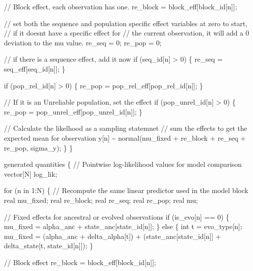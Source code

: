 \documentclass[
]{article}
\newenvironment{Shaded}{\begin{snugshade}}{\end{snugshade}}
\newcommand{\StringTok}[1]{\textcolor[rgb]{0.31,0.60,0.02}{#1}}
\begin{document}
\begin{Shaded}
\begin{Highlighting}[]
\StringTok{    // Block effect, each observation has one.}
\StringTok{    re\_block = block\_eff[block\_id[n]];}

\StringTok{    // set both the sequence and population specific effect variables at zero to start, }
\StringTok{    // if it doesn\textquotesingle{}t have a specific effect for}
\StringTok{    // the current observation, it will add a 0 deviation to the mu value. }
\StringTok{    re\_seq = 0;}
\StringTok{    re\_pop = 0;}

\StringTok{    // if there is a sequence effect, add it now}
\StringTok{    if (seq\_id[n] \textgreater{} 0) \{}
\StringTok{      re\_seq = seq\_eff[seq\_id[n]];}
\StringTok{    \}}

\StringTok{    if (pop\_rel\_id[n] \textgreater{} 0) \{}
\StringTok{      re\_pop = pop\_rel\_eff[pop\_rel\_id[n]];}
\StringTok{    \}}

\StringTok{    // If it is an Unreliable population, set the effect }
\StringTok{    if (pop\_unrel\_id[n] \textgreater{} 0) \{}
\StringTok{      re\_pop = pop\_unrel\_eff[pop\_unrel\_id[n]];}
\StringTok{    \}}

\StringTok{    // Calculate the likelhood as a sampling statemnet}
\StringTok{    // sum the effects to get the expected mean for observation }
\StringTok{    y[n] \textasciitilde{} normal(mu\_fixed + re\_block + re\_seq + re\_pop, sigma\_y);}
\StringTok{  \}}
\StringTok{  }
\StringTok{  }
\StringTok{\}}

\StringTok{generated quantities \{}
\StringTok{  // Pointwise log{-}likelihood values for model comparison}
\StringTok{  vector[N] log\_lik;}

\StringTok{  for (n in 1:N) \{}
\StringTok{    // Recompute the same linear predictor used in the model block}
\StringTok{    real mu\_fixed;}
\StringTok{    real re\_block;}
\StringTok{    real re\_seq;}
\StringTok{    real re\_pop;}
\StringTok{    real mu;}

\StringTok{    // Fixed effects for ancestral or evolved observations}
\StringTok{    if (is\_evo[n] == 0) \{}
\StringTok{      mu\_fixed = alpha\_anc + state\_anc[state\_id[n]];}
\StringTok{    \} else \{}
\StringTok{      int t = evo\_type[n];}
\StringTok{      mu\_fixed =}
\StringTok{        (alpha\_anc + delta\_alpha[t]) +}
\StringTok{        (state\_anc[state\_id[n]] + delta\_state[t, state\_id[n]]);}
\StringTok{    \}}

\StringTok{    // Block effect}
\StringTok{    re\_block = block\_eff[block\_id[n]];}


\end{Highlighting}
\end{Shaded}
\end{document}

